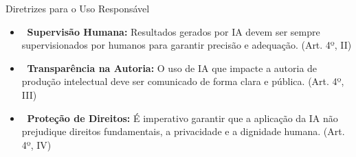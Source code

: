 \documentclass[aspectratio=169,12pt]{beamer}
\begin{document}
\begin{frame}{Diretrizes para o Uso Responsável}
    \begin{itemize}
        \item<1-> \textbf{\faUserCheck\, Supervisão Humana:} Resultados gerados por IA devem ser sempre supervisionados por humanos para garantir precisão e adequação. (Art. 4º, II)
        \item<2-> \textbf{\faBullhorn\, Transparência na Autoria:} O uso de IA que impacte a autoria de produção intelectual deve ser comunicado de forma clara e pública. (Art. 4º, III)
        \item<3-> \textbf{\faBalanceScale\, Proteção de Direitos:} É imperativo garantir que a aplicação da IA não prejudique direitos fundamentais, a privacidade e a dignidade humana. (Art. 4º, IV)
    \end{itemize}
\end{frame}
\end{document}
